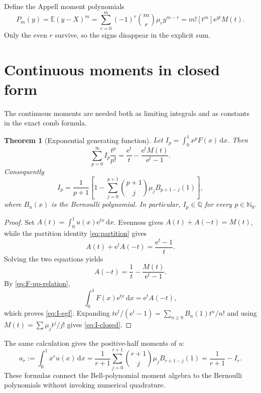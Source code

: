 \documentclass[11pt]{article}
\newtheorem{theorem}{Theorem}[section]
\theoremstyle{definition}
\theoremstyle{remark}
\newcommand{\e}{\mathrm e}
\newcommand{\N}{\mathbb N}
\newcommand{\dd}{\,\mathrm d}
\begin{document}
Define the Appell moment polynomials
\begin{equation}\label{eq:P-m}
 P_m(y)=\mathbb E(y-X)^m
 =\sum_{r=0}^{m}(-1)^r\binom mr\mu_r y^{m-r}
 =m![t^m]\e^{yt}M(t).
\end{equation}
Only the even $r$ survive, so the signs disappear in the explicit sum.

\section{Continuous moments in closed form}

The continuous moments are needed both as limiting integrals and as constants
in the exact comb formula.

\begin{theorem}[Exponential generating function]\label{thm:moment-egf}
Let
\(
 I_p=\int_0^1x^pF(x)\dd x.
\)
Then
\begin{equation}\label{eq:I-egf}
 \sum_{p=0}^{\infty}I_p\frac{t^p}{p!}
 =\frac{\e^t}{t}-\frac{\e^tM(t)}{\e^t-1}.
\end{equation}
Consequently
\begin{equation}\label{eq:I-closed}
 I_p=\frac1{p+1}\left[
 1-\sum_{j=0}^{p+1}\binom{p+1}{j}\mu_j B_{p+1-j}(1)
 \right],
\end{equation}
where $B_n(x)$ is the Bernoulli polynomial.  In particular, $I_p\in\mathbb Q$
for every $p\in\N_0$.
\end{theorem}

\begin{proof}
Set $A(t)=\int_0^1u(x)\e^{tx}\dd x$.  Evenness gives
$A(t)+A(-t)=M(t)$, while the partition identity \eqref{eq:partition} gives
\[
 A(t)+\e^tA(-t)=\frac{\e^t-1}{t}.
\]
Solving the two equations yields
\[
 A(-t)=\frac1t-\frac{M(t)}{\e^t-1}.
\]
By \eqref{eq:F-up-relation},
\[
 \int_0^1F(x)\e^{tx}\dd x
 =\e^tA(-t),
\]
which proves \eqref{eq:I-egf}.  Expanding
\(
 t\e^t/(\e^t-1)=\sum_{n\ge0}B_n(1)t^n/n!
\)
and using $M(t)=\sum\mu_jt^j/j!$ gives \eqref{eq:I-closed}.
\end{proof}

The same calculation gives the positive-half moments of $u$:
\begin{equation}\label{eq:a-r}
 a_r:=\int_0^1x^ru(x)\dd x
 =\frac1{r+1}\sum_{j=0}^{r+1}
   \binom{r+1}{j}\mu_jB_{r+1-j}(1)
 =\frac1{r+1}-I_r.
\end{equation}
These formulas connect the Bell-polynomial moment algebra to the Bernoulli
polynomials without invoking numerical quadrature.
\end{document}
